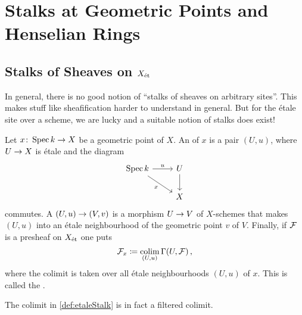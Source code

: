 \documentclass[a4paper, 10pt, oneside, DIV=9, chapterprefix=true, numbers=enddot, bibliography=totoc]{scrbook}
\begin{document}
\section{Stalks at Geometric Points and Henselian Rings}
\subsection{Stalks of Sheaves on \texorpdfstring{$X_{\mathrm{\acute{e}t}}$}{Xet}}
In general, there is no good notion of \enquote{stalks of sheaves on arbitrary sites}. This makes stuff like sheafification harder to understand in general. But for the étale site over a scheme, we are lucky and a suitable notion of stalks does exist!

\begin{defi}\label{def:etaleStalk}
	Let $x\colon \Spec k\morphism X$ be a geometric point of $X$. An  of $x$ is a pair $(U,u)$, where $U\morphism X$ is étale and the diagram
	\begin{equation*}
		\begin{tikzcd}
			\Spec k\rar["u"]\drar["x"{swap}]& U\dar\\
			 & X\end{tikzcd}
	\end{equation*}
	commutes. A  $(U,u)\morphism(V,v)$ is a morphism $U\morphism V$ of $X$-schemes that makes $(U,u)$ into an étale neighbourhood of the geometric point $v$ of $V$. Finally, if $\mathcal{F}$ is a presheaf on $X_{\mathrm{\acute{e}t}}$ one puts
	\begin{equation*}
		\mathcal{F}_x\coloneqq \operatorname*{colim}_{(U,u)}\operatorname{\Gamma}(U,\mathcal{F})\,,
	\end{equation*}
	where the colimit is taken over all étale neighbourhoods $(U,u)$ of $x$. This is called the .
\end{defi}
\begin{fact}\label{fact:filtered}
	The colimit in \cref{def:etaleStalk} is in fact a filtered colimit.
\end{fact}
\end{document}
